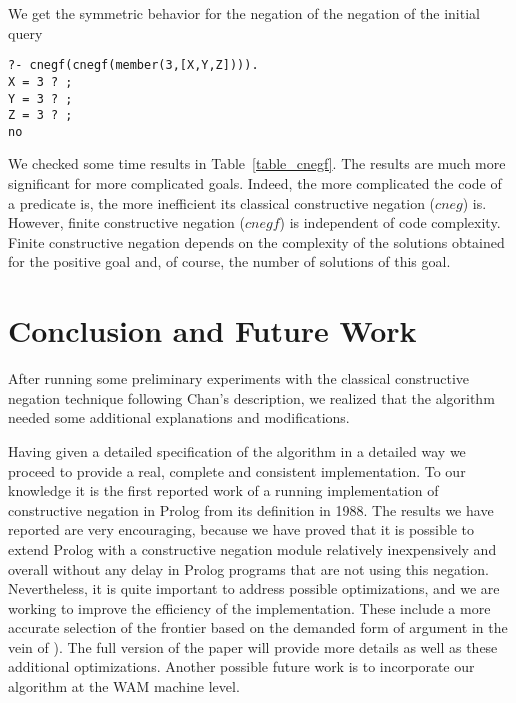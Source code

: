 \documentclass{llncs}
\begin{document}
We get the symmetric behavior for the negation of the
negation of the initial query
{\small
\begin{verbatim}
?- cnegf(cnegf(member(3,[X,Y,Z]))).
X = 3 ? ;
Y = 3 ? ;
Z = 3 ? ;
no
\end{verbatim}
}


We checked some time results in Table~\ref{table_cnegf}. The results
are much more significant for more complicated goals. Indeed, the more
complicated the code of a predicate is, the more inefficient its
classical constructive negation ($cneg$) is. However, finite
constructive negation ($cnegf$) is independent of code
complexity. Finite constructive negation depends on the complexity of
the solutions obtained for the positive goal and, of course, the
number of solutions of this goal.




\section{Conclusion and Future Work}
\label{conclusion}
After running some preliminary experiments with the classical constructive 
negation technique  following Chan's description, we realized that the
algorithm needed some additional explanations and modifications.

Having given a detailed specification of the algorithm in a detailed way
we proceed to provide a real, complete and consistent
implementation. To our knowledge it is the first reported work of a running
implementation
of constructive negation in Prolog from its definition in 1988. 
The results we have reported are very encouraging,
because we have proved that it is possible to extend Prolog with a
constructive negation module relatively inexpensively and overall
without any delay in Prolog programs that are not using this
negation. Nevertheless, it is quite important to address possible
optimizations, and we are working to improve the efficiency of the
implementation. These include a more accurate selection of the
frontier based on the demanded form of argument in the vein of
\cite{Moreno2}). The full version of the paper will provide more details
as well as these additional optimizations.
Another possible future work is to incorporate our algorithm
at the WAM machine level.
\end{document}

